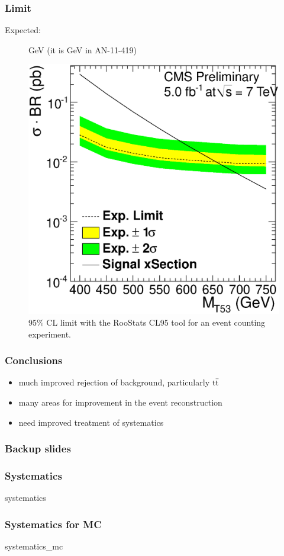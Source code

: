 \documentclass[ukenglish]{beamer}
\begin{document}
\begin{frame}
    \frametitle{Limit}
    \begin{description}
        \item[Expected:] \unit[658]{GeV} (it is \unit[645]{GeV} in AN-11-419)
    \end{description}
    \begin{figure}[h]
        \centering
    \includegraphics[height=.6\textheight]{oLimit_limit_macro_4jets_opt_btag_200_350_02.eps}
        \caption{95\% CL limit with the RooStats CL95 tool for an event
        counting experiment.}
    \end{figure}
\end{frame}

\begin{frame}
    \frametitle{Conclusions}
    \begin{itemize}
        \item much improved rejection of background, particularly $\mathrm{t}\bar{\mathrm{t}}$
        \item many areas for improvement in the event reconstruction
        \item need improved treatment of systematics
    \end{itemize}
\end{frame}

\begin{frame}
    \frametitle{Backup slides}
\end{frame}

\begin{frame}
    \frametitle{Systematics}
    {systematics}
\end{frame}

\begin{frame}
    \frametitle{Systematics for MC}
    {systematics_mc}
\end{frame}
\end{document}
